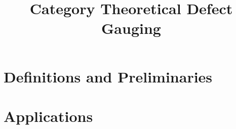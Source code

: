
\title{Category Theoretical Defect Gauging}



\maketitle

\begin{abstract}
	
\end{abstract}

\section{Definitions and Preliminaries}





\section{Applications}






